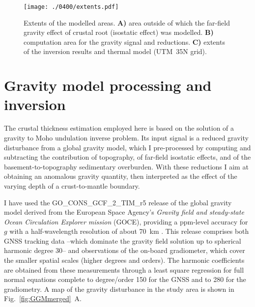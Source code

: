 \begin{figure}
    \begin{adjustbox}{center}
    \texttt{[image: ./0400/extents.pdf]}
    \end{adjustbox}
    \caption[Gravity modelling: extents of the modelled areas.]{Extents of the modelled areas. \textbf{A)} area outside of which the far-field gravity effect of crustal root (isostatic effect) was modelled. \textbf{B)} computation area for the gravity signal and reductions. \textbf{C)} extents of the inversion results and thermal model (UTM~35N grid).}
	\label{fig:extents}
\end{figure}

\section{Gravity model processing and inversion}
\label{s:Appl:Grav}

The crustal thickness estimation employed here is based on the solution of a gravity to Moho undulation inverse problem.
Its input signal is a reduced gravity disturbance from a global gravity model, which I pre-processed by computing and subtracting the contribution of topography, of far-field isostatic effects, and of the basement-to-topography sedimentary overburden.
With these reductions I aim at obtaining an anomalous gravity quantity, then interpreted as the effect of the varying depth of a crust-to-mantle boundary.

I have used the {GO\_CONS\_GCF\_2\_TIM\_r5} release \parencites{Brockmann2014}{Pail2011GOCE}{GOCETIMr5datasheet} of the global gravity model derived from the European Space Agency's \textit{Gravity field and steady-state Ocean Circulation Explorer mission} (GOCE), providing a ppm-level accuracy for $g$ with a half-wavelength resolution of about 70~\si{\kilo \metre} \parencite{Floberghagen2011_goce}.
This release comprises both GNSS tracking data --which dominate the gravity field solution up to spherical harmonic degree 30-- and observations of the on-board gradiometer, which cover the smaller spatial scales (higher degrees and orders).
The harmonic coefficients are obtained from these measurements through a least square regression for full normal equations complete to degree/order 150 for the GNSS and to 280 for the gradiometry.
A map of the gravity disturbance in the study area is shown in Fig.~\ref{fig:GGMmerged}~A.

